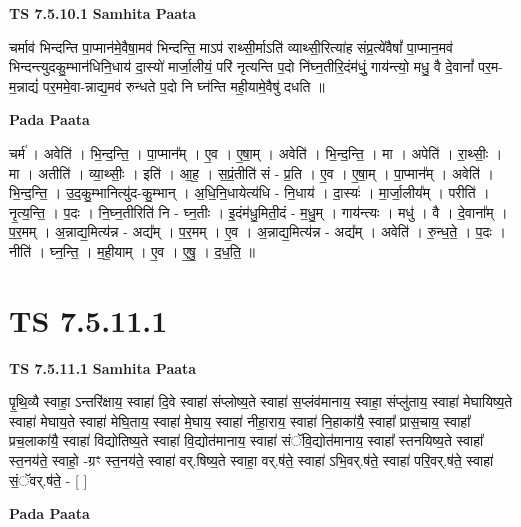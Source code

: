 \documentclass[17pt]{extarticle}
\begin{document}
\textbf{TS 7.5.10.1 } \newline
\textbf{Samhita Paata} \newline

चर्माव॑ भिन्दन्ति पा॒प्मान॑मे॒वैषा॒मव॑ भिन्दन्ति॒ माऽप॑ राथ्सी॒र्माऽति॑ व्याथ्सी॒रित्या॑ह संप्र॒त्ये॑वैषां᳚ पा॒प्मान॒मव॑ भिन्दन्त्युदकु॒म्भान॑धिनि॒धाय॑ दा॒स्यो॑ मार्जा॒लीयं॒ परि॑ नृत्यन्ति प॒दो नि॑घ्न॒तीरि॒दंम॑धुं॒ गाय॑न्त्यो॒ मधु॒ वै दे॒वानां᳚ पर॒म-म॒न्नाद्यं॑ पर॒ममे॒वा-न्नाद्य॒मव॑ रुन्धते प॒दो नि घ्न॑न्ति मही॒यामे॒वैषु॑ दधति ॥ \newline

\textbf{Pada Paata} \newline

चर्म॑ । अवेति॑ । भि॒न्द॒न्ति॒ । पा॒प्मान᳚म् । ए॒व । ए॒षा॒म् । अवेति॑ । भि॒न्द॒न्ति॒ । मा । अपेति॑ । रा॒थ्सीः॒ । मा । अतीति॑ । व्या॒थ्सीः॒ । इति॑ । आ॒ह॒ । स॒प्रं॒तीति॑ सं - प्र॒ति । ए॒व । ए॒षा॒म् । पा॒प्मान᳚म् । अवेति॑ । भि॒न्द॒न्ति॒ । उ॒द॒कु॒म्भानित्यु॑द-कु॒म्भान् । अ॒धि॒नि॒धायेत्य॑धि - नि॒धाय॑ । दा॒स्यः॑ । मा॒र्जा॒लीय᳚म् । परीति॑ । नृ॒त्य॒न्ति॒ । प॒दः । नि॒घ्न॒तीरिति॑ नि - घ्न॒तीः । इ॒दंम॑धु॒मिती॒दं - म॒धु॒म् । गाय॑न्त्यः । मधु॑ । वै । दे॒वाना᳚म् । प॒र॒मम् । अ॒न्नाद्य॒मित्य॑न्न - अद्य᳚म् । प॒र॒मम् । ए॒व । अ॒न्नाद्य॒मित्य॑न्न - अद्य᳚म् । अवेति॑ । रु॒न्ध॒ते॒ । प॒दः । नीति॑ । घ्न॒न्ति॒ । म॒ही॒याम् । ए॒व । ए॒षु॒ । द॒ध॒ति॒ ॥  \newline





\section{ TS 7.5.11.1 }

\textbf{TS 7.5.11.1 } \newline
\textbf{Samhita Paata} \newline

पृ॒थि॒व्यै स्वाहा॒ ऽन्तरि॑क्षाय॒ स्वाहा॑ दि॒वे स्वाहा॑ संप्लोष्य॒ते स्वाहा॑ स॒प्लंव॑मानाय॒ स्वाहा॒ संप्लु॑ताय॒ स्वाहा॑ मेघायिष्य॒ते स्वाहा॑ मेघाय॒ते स्वाहा॑ मेघि॒ताय॒ स्वाहा॑ मे॒घाय॒ स्वाहा॑ नीहा॒राय॒ स्वाहा॑ नि॒हाका॑यै॒ स्वाहा᳚ प्रास॒चाय॒ स्वाहा᳚ प्रच॒लाका॑यै॒ स्वाहा॑ विद्योतिष्य॒ते स्वाहा॑ वि॒द्योत॑मानाय॒ स्वाहा॑ संॅवि॒द्योत॑मानाय॒ स्वाहा᳚ स्तनयिष्य॒ते स्वाहा᳚ स्त॒नय॑ते॒ स्वाहो॒ -ग्रꣳ स्त॒नय॑ते॒ स्वाहा॑ वर्.षिष्य॒ते स्वाहा॒ वर्.ष॑ते॒ स्वाहा॑ ऽभि॒वर्.ष॑ते॒ स्वाहा॑ परि॒वर्.ष॑ते॒ स्वाहा॑ सं॒ॅवर्.ष॑ते॒ - [  ] \newline

\textbf{Pada Paata} \newline
\end{document}
